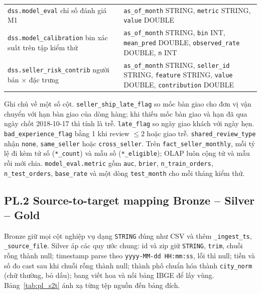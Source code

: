 \documentclass[a4paper]{article}
\begin{document}
{\begin{longtable}{@{}>{\raggedright\arraybackslash}p{3.6cm}>{\raggedright\arraybackslash}p{12.6cm}@{}}
\addlinespace
\texttt{dss.model\_\allowbreak{}eval} \newline 1 chỉ số đánh giá M1 & \texttt{as\_\allowbreak{}of\_\allowbreak{}month} STRING, \texttt{metric} STRING, \texttt{value} DOUBLE \\
\addlinespace
\texttt{dss.model\_\allowbreak{}calibration} \newline 1 bin xác suất trên tập kiểm thử & \texttt{as\_\allowbreak{}of\_\allowbreak{}month} STRING, \texttt{bin} INT, \texttt{mean\_\allowbreak{}pred} DOUBLE, \texttt{observed\_\allowbreak{}rate} DOUBLE, \texttt{n} INT \\
\addlinespace
\texttt{dss.seller\_\allowbreak{}risk\_\allowbreak{}contrib} \newline 1 người bán $\times$ đặc trưng & \texttt{as\_\allowbreak{}of\_\allowbreak{}month} STRING, \texttt{seller\_\allowbreak{}id} STRING, \texttt{feature} STRING, \texttt{value} DOUBLE, \texttt{contribution} DOUBLE \\
\end{longtable}
}

Ghi chú về một số cột. \texttt{seller\_\allowbreak{}ship\_\allowbreak{}late\_\allowbreak{}flag} so mốc bàn giao cho đơn vị vận chuyển với hạn bàn giao của dòng hàng; khi thiếu mốc bàn giao và hạn đã qua ngày chốt 2018-10-17 thì tính là trễ. \texttt{late\_\allowbreak{}flag} so ngày giao khách với ngày hẹn. \texttt{bad\_\allowbreak{}experience\_\allowbreak{}flag} bằng 1 khi review $\le 2$ hoặc giao trễ. \texttt{shared\_\allowbreak{}review\_\allowbreak{}type} nhận \texttt{none}, \texttt{same\_\allowbreak{}seller} hoặc \texttt{cross\_\allowbreak{}seller}. Trên \texttt{fact\_\allowbreak{}seller\_\allowbreak{}monthly}, mỗi tỷ lệ đi kèm tử số (\texttt{*\_\allowbreak{}count}) và mẫu số (\texttt{*\_\allowbreak{}eligible}); OLAP luôn cộng tử và mẫu rồi mới chia. \texttt{model\_\allowbreak{}eval.metric} gồm \texttt{auc}, \texttt{brier}, \texttt{n\_\allowbreak{}train\_\allowbreak{}orders}, \texttt{n\_\allowbreak{}test\_\allowbreak{}orders}, \texttt{base\_\allowbreak{}rate} và một dòng \texttt{test\_\allowbreak{}month} cho mỗi tháng kiểm thử.

\label{pl:2}
\subsection*{PL.2 Source-to-target mapping Bronze -- Silver -- Gold}

Bronze giữ mọi cột nghiệp vụ dạng \texttt{STRING} đúng như CSV và thêm \texttt{\_\allowbreak{}ingest\_\allowbreak{}ts}, \texttt{\_\allowbreak{}source\_\allowbreak{}file}. Silver áp các quy ước chung: id và zip giữ \texttt{STRING}, \texttt{trim}, chuỗi rỗng thành null; timestamp parse theo \texttt{yyyy-MM-dd HH:mm:ss}, lỗi thì null; tiền và số đo cast sau khi chuỗi rỗng thành null; thành phố chuẩn hóa thành \texttt{city\_\allowbreak{}norm} (chữ thường, bỏ dấu); bang viết hoa và nối bảng IBGE để lấy vùng. Bảng~\ref{tab:pl_s2t} ánh xạ từng tệp nguồn đến bảng đích.
\end{document}
